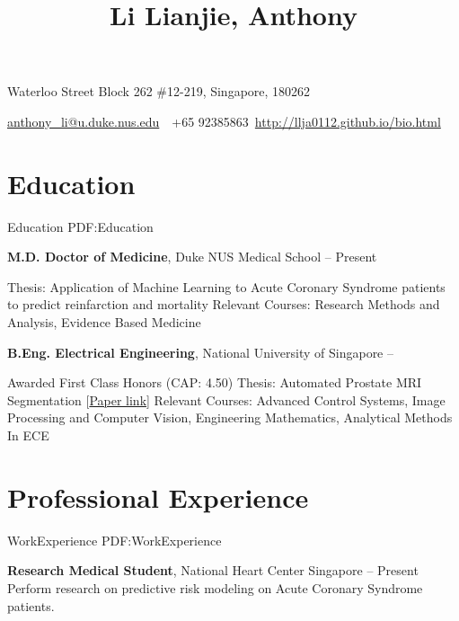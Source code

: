 \documentclass[letterpaper,10pt,oneside]{article}
\newcommand{\CVAuthor}{Li Lianjie, Anthony}
\newcommand{\CVWebpage}{http://llja0112.github.io/bio.html}
\begin{document}

\title{\CVAuthor}

\begin{subtitle}
{Waterloo Street Block 262 \#12-219, Singapore, 180262}
\par
\href{mailto:anthony_li@u.duke.nus.edu}
{anthony\_li@u.duke.nus.edu}
\,\SubBulletSymbol\,
+65 92385863\,
\href{\CVWebpage}
{\CVWebpage}
\end{subtitle}

\begin{body}


\section
{Education}
{Education}
{PDF:Education}

{\textbf{M.D. Doctor of Medicine}, Duke NUS Medical School}
\hfill
{} -- Present 

\GapNoBreak
\BulletItem
Thesis: Application of Machine Learning to Acute Coronary Syndrome patients to predict 
\newline reinfarction and mortality
\BulletItem
Relevant Courses: Research Methods and Analysis, Evidence Based Medicine

\BigGap
{\textbf{B.Eng. Electrical Engineering}, National University of Singapore}
\hfill
{} --

\GapNoBreak
\BulletItem
Awarded First Class Honors (CAP: 4.50)
\BulletItem
Thesis: Automated Prostate MRI Segmentation [\href{https://drive.google.com/open?id=0B1GfPKwMcZtpdWp0aUpxMnlKbU1oLVJFbjN3bGwwcXZlVVNJ}{Paper link}]
\BulletItem
Relevant Courses: Advanced Control Systems, Image Processing and Computer Vision, Engineering Mathematics, Analytical Methods In ECE

\section
{Professional Experience}
{WorkExperience}
{PDF:WorkExperience}

{\textbf{Research Medical Student}, National Heart Center Singapore}
\hfill
{} -- Present
\BulletItem 
Perform research on predictive risk modeling on Acute Coronary Syndrome patients. 


\end{body}
\end{document}
